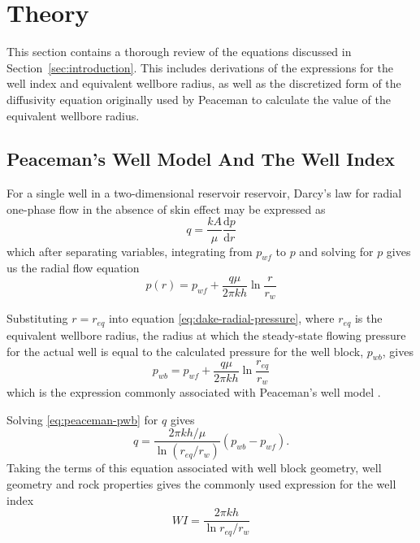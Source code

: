 
\section{Theory} %
\label{sec:theory}
This section contains a thorough review of the equations discussed in Section~\ref{sec:introduction}. This includes derivations of the expressions for the well index and equivalent wellbore radius, as well as  the discretized form of the  diffusivity equation originally used by Peaceman to calculate the value of the equivalent wellbore radius.

\subsection{Peaceman's Well Model And The Well Index} %
\label{sub:well_indices}
For a single well in a two-dimensional reservoir reservoir, Darcy's law for radial one-phase flow in the absence of skin effect may be expressed as \cite{Dake1978Developments}
\begin{equation}
    \label{eq:darcy}
    q = \frac{kA}{\mu} \frac{\mathrm{d}p}{\mathrm{d}r}
\end{equation}
which after separating variables, integrating from $p_{wf}$ to $p$ and solving for $p$ gives us the radial flow equation
\begin{equation}
    \label{eq:dake-radial-pressure}
    p(r) = p_{wf} + \frac{q\mu}{2\pi kh} \ln{\frac{r}{r_w}}
\end{equation}

Substituting $r=r_{eq}$ into equation \eqref{eq:dake-radial-pressure}, where $r_{eq}$ is the equivalent wellbore radius, the radius at which the steady-state flowing pressure for the actual well is equal to the calculated pressure for the well block, $p_{wb}$, gives
\begin{equation}
    \label{eq:peaceman-pwb}
    p_{wb} = p_{wf} + \frac{q\mu}{2\pi kh} \ln{\frac{r_{eq}}{r_w}}
\end{equation}
which is the expression commonly associated with Peaceman's well model \cite{Peaceman1978Interpretation}.

Solving \eqref{eq:peaceman-pwb} for $q$ gives
\begin{equation}
    \label{eq:peaceman-model-q}
    q = \frac{2\pi k h / \mu}{\ln (r_{eq}/{r_w})} \left( p_{wb} - p_{wf} \right).
\end{equation}
Taking the terms of this equation associated with well block geometry, well geometry and rock properties gives the commonly used expression for the well index
\begin{equation}
    \label{eq:peaceman-wi2}
    WI = \frac{2\pi kh}{\ln{r_{eq}/r_w}}
\end{equation}

